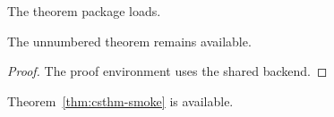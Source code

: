 \documentclass{article}
\begin{document}
\begin{theorem}\label{thm:csthm-smoke}The theorem package loads.\end{theorem}
\begin{theorem*}The unnumbered theorem remains available.\end{theorem*}
\begin{proof}The proof environment uses the shared backend.\end{proof}
Theorem~\cref{thm:csthm-smoke} is available.
\end{document}
